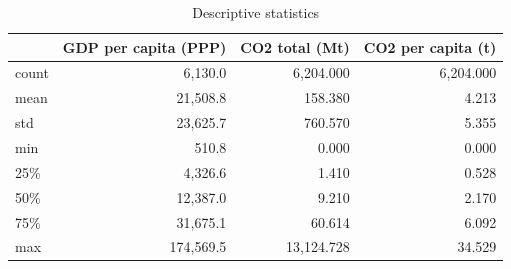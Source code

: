 \begin{table}[h]
\centering
\caption{Descriptive statistics}
\begin{tabular}{lrrr}
\toprule
 & GDP per capita (PPP) & CO2 total (Mt) & CO2 per capita (t) \\
\midrule
count & 6,130.0 & 6,204.000 & 6,204.000 \\
mean & 21,508.8 & 158.380 & 4.213 \\
std & 23,625.7 & 760.570 & 5.355 \\
min & 510.8 & 0.000 & 0.000 \\
25\% & 4,326.6 & 1.410 & 0.528 \\
50\% & 12,387.0 & 9.210 & 2.170 \\
75\% & 31,675.1 & 60.614 & 6.092 \\
max & 174,569.5 & 13,124.728 & 34.529 \\
\bottomrule
\end{tabular}
\end{table}
